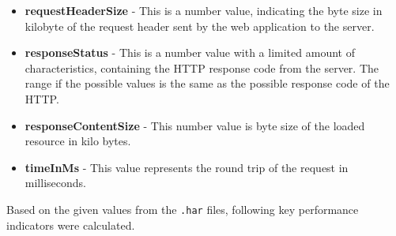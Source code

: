 \begin{itemize}
	\item \textbf{requestHeaderSize}	- This is a number value, indicating the byte size in kilobyte of the request header sent by the web application to the server.
	
	\item \textbf{responseStatus} - This is a number value with a limited amount of characteristics, containing the HTTP response code from the server. The range if the possible values is the same as the possible response code of the HTTP.
	
	\item \textbf{responseContentSize} - This number value is byte size of the loaded resource in kilo bytes.
	
	\item \textbf{timeInMs} - This value represents the round trip of the request in milliseconds. 
\end{itemize}

Based on the given values from the \texttt{.har} files, following key performance indicators were calculated.

